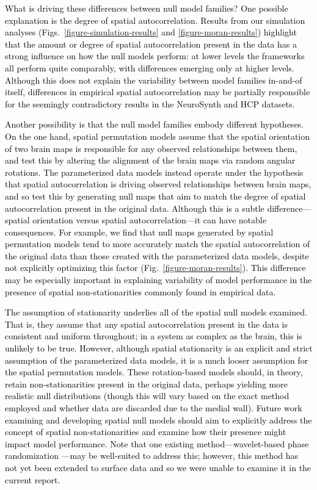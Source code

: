 \documentclass[12pt,aps,pra,reprint,showkeys]{revtex4-1}
\newcommand{\nimg}[1]{\textcolor{black}{{#1}}}
\begin{document}
\nimg{What is driving these differences between null model families?
One possible explanation is the degree of spatial autocorrelation.
Results from our simulation analyses (Figs.~\ref{figure-simulation-results} and \ref{figure-moran-results}) highlight that the amount or degree of spatial autocorrelation present in the data has a strong influence on how the null models perform: at lower levels the frameworks all perform quite comparably, with differences emerging only at higher levels.
Although this does not explain the variability between model families in-and-of itself, differences in empirical spatial autocorrelation may be partially responsible for the seemingly contradictory results in the NeuroSynth and HCP datasets.}

\nimg{Another possibility is that the null model families embody different hypotheses.
On the one hand, spatial permutation models assume that the spatial orientation of two brain maps is responsible for any observed relationships between them, and test this by altering the alignment of the brain maps via random angular rotations.
The parameterized data models instead operate under the hypothesis that spatial autocorrelation is driving observed relationships between brain maps, and so test this by generating null maps that aim to match the degree of spatial autocorrelation present in the original data.
Although this is a subtle difference---spatial orientation versus spatial autocorrelation---it can have notable consequences.
For example, we find that null maps generated by spatial permutation models tend to more accurately match the spatial autocorrelation of the original data than those created with the parameterized data models, despite not explicitly optimizing this factor (Fig.~\ref{figure-moran-results}).
This difference may be especially important in explaining variability of model performance in the presence of spatial non-stationarities commonly found in empirical data.}

\nimg{The assumption of stationarity underlies all of the spatial null models examined.
That is, they assume that any spatial autocorrelation present in the data is consistent and uniform throughout; in a system as complex as the brain, this is unlikely to be true.
However, although spatial stationarity is an explicit and strict assumption of the parameterized data models, it is a much looser assumption for the spatial permutation models.
These rotation-based models should, in theory, retain non-stationarities present in the original data, perhaps yielding more realistic null distributions (though this will vary based on the exact method employed and whether data are discarded due to the medial wall).
Future work examining and developing spatial null models should aim to explicitly address the concept of spatial non-stationarities and examine how their presence might impact model performance.
Note that one existing method---wavelet-based phase randomization \citep{breakspear2003construction, breakspear2004spatiotemporal}---may be well-suited to address this; however, this method has not yet been extended to surface data and so we were unable to examine it in the current report.}
\end{document}
